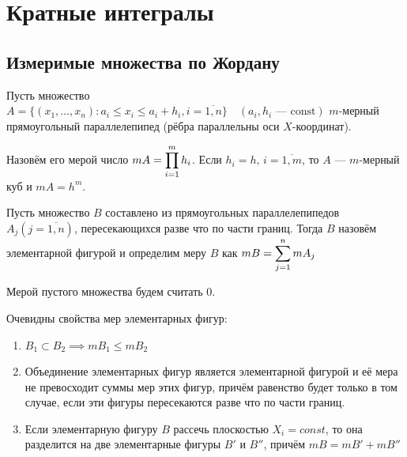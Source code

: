 \section{Кратные интегралы}

\subsection{Измеримые множества по Жордану}

\begin{definition}
    Пусть множество 
    $A = \{ (x_1, \dots, x_n): a_i \leq x_i \leq a_i + h_i, i = \overline{1, n} \}
    \quad (a_i, h_i \text{ --- const})$ $m$-мерный прямоугольный параллелепипед
    (рёбра параллельны оси $X$-координат).

    Назовём его мерой число $mA = \displaystyle\prod_{i = 1}^m h_i$.
    Если $h_i = h, \, i = \overline{1, m}$, то $A$ --- 
    $m$-мерный куб и $mA = h^m$.
\end{definition}

\begin{definition}
    Пусть множество $B$ составлено из прямоугольных параллелепипедов
    $A_j (j = \overline{1, n})$, пересекающихся разве что по части границ.
    Тогда $B$ назовём элементарной фигурой и определим меру $B$ как 
    $mB = \displaystyle\sum_{j = 1}^n m A_j$

    Мерой пустого множества будем считать 0.
\end{definition}

\begin{remark}
    Очевидны свойства мер элементарных фигур:

    \begin{enumerate}
        \item $B_1 \subset B_2 \implies mB_1 \leq mB_2$
        \item
            Объединение элементарных фигур является элементарной фигурой и её
            мера не превосходит суммы мер этих фигур, причём равенство будет
            только в том случае, если эти фигуры пересекаются разве что по
            части границ.
        \item
            Если элементарную фигуру $B$ рассечь плоскостью $X_i = const$, то
            она разделится на две элементарные фигуры $B'$ и $B''$, причём
            $mB = mB' + mB''$
    \end{enumerate}
\end{remark}

